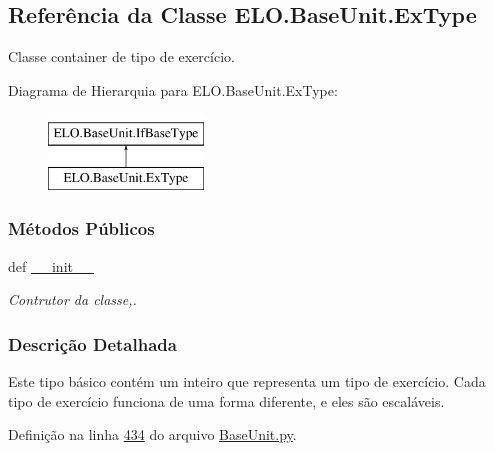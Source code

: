 \hypertarget{classELO_1_1BaseUnit_1_1ExType}{\subsection{Referência da Classe E\-L\-O.\-Base\-Unit.\-Ex\-Type}
\label{classELO_1_1BaseUnit_1_1ExType}
}


Classe container de tipo de exercício.  


Diagrama de Hierarquia para E\-L\-O.\-Base\-Unit.\-Ex\-Type\-:\begin{figure}[H]
\begin{center}
\leavevmode
\includegraphics[height=2.000000cm]{de/d96/classELO_1_1BaseUnit_1_1ExType}
\end{center}
\end{figure}
\subsubsection*{Métodos Públicos}
\begin{DoxyCompactItemize}
\item 
def \hyperlink{classELO_1_1BaseUnit_1_1ExType_aca9932deaf8fe247d16ce17909d3dfbf}{\-\_\-\-\_\-init\-\_\-\-\_\-}
\begin{DoxyCompactList}\small\item\em Contrutor da classe,. \end{DoxyCompactList}\end{DoxyCompactItemize}


\subsubsection{Descrição Detalhada}
Este tipo básico contém um inteiro que representa um tipo de exercício. Cada tipo de exercício funciona de uma forma diferente, e eles são escaláveis. 

Definição na linha \hyperlink{BaseUnit_8py_source_l00434}{434} do arquivo \hyperlink{BaseUnit_8py_source}{Base\-Unit.\-py}.



